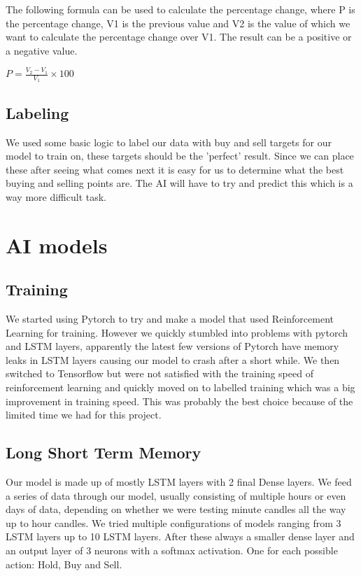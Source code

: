 \documentclass[12pt,a4paper]{article}
\begin{document}
The following formula can be used to calculate the percentage change, where P is the percentage change, V1 is the previous value and V2 is the value of which we want to calculate the percentage change over V1. The result can be a positive or a negative value.

{\large \( P = \frac{ V_2 - V_1 }{ V_1 } \times 100 \)}

\subsection{Labeling}

We used some basic logic to label our data with buy and sell targets for our model to train on, these targets should be the 'perfect' result. Since we can place these after seeing what comes next it is easy for us to determine what the best buying and selling points are. The AI will have to try and predict this which is a way more difficult task.

\section{AI models}
\subsection{Training}

We started using Pytorch to try and make a model that used Reinforcement Learning for training. However we quickly stumbled into problems with pytorch and LSTM layers, apparently the latest few versions of Pytorch have memory leaks in LSTM layers causing our model to crash after a short while.
We then switched to Tensorflow but were not satisfied with the training speed of reinforcement learning and quickly moved on to labelled training which was a big improvement in training speed. This was probably the best choice because of the limited time we had for this project.

\subsection{Long Short Term Memory}

Our model is made up of mostly LSTM layers with 2 final Dense layers.
We feed a series of data through our model, usually consisting of multiple hours or even days of data, depending on whether we were testing minute candles all the way up to hour candles.
We tried multiple configurations of models ranging from 3 LSTM layers up to 10 LSTM layers. After these always a smaller dense layer and an output layer of 3 neurons with a softmax activation. One for each possible action: Hold, Buy and Sell.
\end{document}
